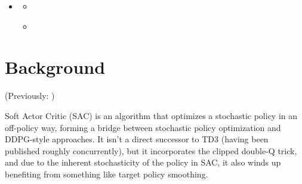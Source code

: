 \documentclass[letterpaper,10pt,english]{sphinxmanual}
\begin{document}
\begin{sphinxShadowBox}
\begin{itemize}
\begin{itemize}
\begin{itemize}
\item {} 
\label{\detokenize{algorithms/sac:id12}}{\hyperref[\detokenize{algorithms/sac:saved-model-contents-pytorch-version}]{}}

\item {} 
\label{\detokenize{algorithms/sac:id13}}{\hyperref[\detokenize{algorithms/sac:documentation-tensorflow-version}]{}}

\item {} 
\label{\detokenize{algorithms/sac:id14}}{\hyperref[\detokenize{algorithms/sac:saved-model-contents-tensorflow-version}]{}}

\end{itemize}

\item {} 
\label{\detokenize{algorithms/sac:id15}}{\hyperref[\detokenize{algorithms/sac:references}]{}}
\begin{itemize}
\item {} 
\label{\detokenize{algorithms/sac:id16}}{\hyperref[\detokenize{algorithms/sac:relevant-papers}]{}}

\item {} 
\label{\detokenize{algorithms/sac:id17}}{\hyperref[\detokenize{algorithms/sac:other-public-implementations}]{}}

\end{itemize}

\end{itemize}

\end{itemize}
\end{sphinxShadowBox}


\section{Background}
\label{\detokenize{algorithms/sac:background}}
(Previously: )

Soft Actor Critic (SAC) is an algorithm that optimizes a stochastic policy in an off-policy way, forming a bridge between stochastic policy optimization and DDPG-style approaches. It isn’t a direct successor to TD3 (having been published roughly concurrently), but it incorporates the clipped double-Q trick, and due to the inherent stochasticity of the policy in SAC, it also winds up benefiting from something like target policy smoothing.
\end{document}
